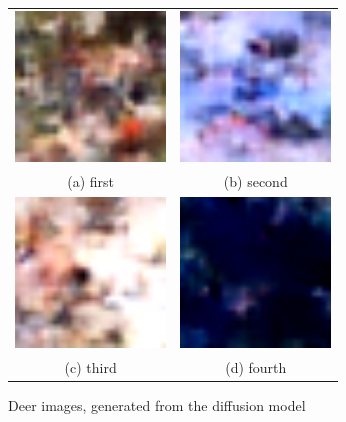 \documentclass[conference]{IEEEtran}
\begin{document}
      \begin{figure}
        \begin{tabular}{cc}
          \includegraphics[width=40mm]{./images/generated-imgs-cosine/deer/0408.png} 
      &   \includegraphics[width=40mm]{./images/generated-imgs-cosine/deer/0409.png} 
      \\
        (a) first 
        & (b) second \\[6pt]
           \includegraphics[width=40mm]{./images/generated-imgs-cosine/deer/0410.png} 
        &  \includegraphics[width=40mm]{./images/generated-imgs-cosine/deer/0411.png} 
      \\
        (c) third & (d) fourth \\[6pt]
        \end{tabular}
        \caption{Deer images, generated from the diffusion model}
        \end{figure}
    
\end{document}
